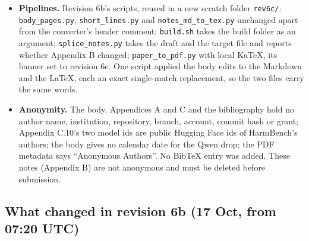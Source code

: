 \documentclass{article}
\theoremstyle{plain}
\theoremstyle{definition}
\theoremstyle{remark}
\begin{document}
\begin{itemize}
        26, 28, 32, 40 and 48 updated and 49--51 added; risks 30, 34, 51, 56 and
        59 updated; CITE-CHECK 36; the development evidence's HarmBench item and
        a status line at revision 6c; conflicts 52--56 updated and 64--69 added;
        ``Sources read (revision 6c)''. The LaTeX Appendix B is regenerated from
        these notes with revision 6b's converter, which reproduced revision 6b's
        Appendix B byte for byte from revision 6b's notes before any edit (its
        header comment now says revision 6c).
  \item \textbf{Pipelines.} Revision 6b's scripts, reused in a new scratch
        folder \nolinkurl{rev6c/}: \nolinkurl{body_pages.py},
        \nolinkurl{short_lines.py} and \nolinkurl{notes_md_to_tex.py} unchanged
        apart from the converter's header comment; \nolinkurl{build.sh} takes
        the build folder as an argument; \nolinkurl{splice_notes.py} takes the
        draft and the target file and reports whether Appendix B changed;
        \nolinkurl{paper_to_pdf.py} with local KaTeX, its banner set to revision
        6c. One script applied the body edits to the Markdown and the LaTeX,
        each an exact single-match replacement, so the two files carry the same
        words.
  \item \textbf{Anonymity.} The body, Appendices A and C and the bibliography
        hold no author name, institution, repository, branch, account, commit
        hash or grant; Appendix C.10's two model ids are public Hugging Face ids
        of HarmBench's authors; the body gives no calendar date for the Qwen
        drop; the PDF metadata says ``Anonymous Authors''. No BibTeX entry was
        added. These notes (Appendix B) are not anonymous and must be deleted
        before submission.
\end{itemize}

\subsection{What changed in revision 6b (17 Oct, from 07:20 UTC)}
\end{document}
